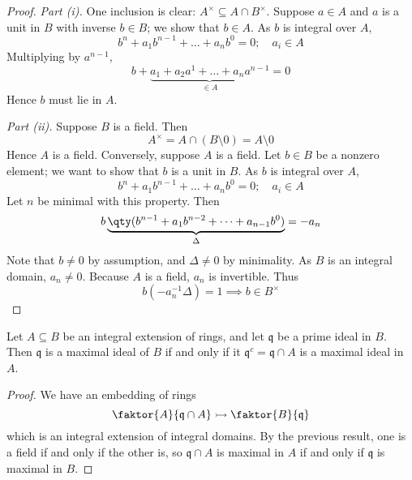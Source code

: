 \begin{proof}
    \emph{Part (i).}
    One inclusion is clear: \( A^\times \subseteq A \cap B^\times \).
    Suppose \( a \in A \) and \( a \) is a unit in \( B \) with inverse \( b \in B \); we show that \( b \in A \).
    As \( b \) is integral over \( A \),
    \[ b^n + a_1 b^{n-1} + \dots + a_n b^0 = 0;\quad a_i \in A \]
    Multiplying by \( a^{n-1} \),
    \[ b + \underbrace{a_1 + a_2 a^1 + \dots + a_n a^{n-1}}_{\in A} = 0 \]
    Hence \( b \) must lie in \( A \).

    \emph{Part (ii).}
    Suppose \( B \) is a field.
    Then
    \[ A^\times = A \cap (B \setminus \qty{0}) = A \setminus \qty{0} \]
    Hence \( A \) is a field.
    Conversely, suppose \( A \) is a field.
    Let \( b \in B \) be a nonzero element; we want to show that \( b \) is a unit in \( B \).
    As \( b \) is integral over \( A \),
    \[ b^n + a_1 b^{n-1} + \dots + a_n b^0 = 0;\quad a_i \in A \]
    Let \( n \) be minimal with this property.
    Then
    \[ b\underbrace{\qty(b^{n-1} + a_1 b^{n-2} + \dots + a_{n-1} b^0)}_{\Delta} = -a_n \]
    Note that \( b \neq 0 \) by assumption, and \( \Delta \neq 0 \) by minimality.
    As \( B \) is an integral domain, \( a_n \neq 0 \).
    Because \( A \) is a field, \( a_n \) is invertible.
    Thus
    \[ b(-a_n^{-1} \Delta) = 1 \implies b \in B^\times \]
\end{proof}
\begin{corollary}
    Let \( A \subseteq B \) be an integral extension of rings, and let \( \mathfrak q \) be a prime ideal in \( B \).
    Then \( \mathfrak q \) is a maximal ideal of \( B \) if and only if it \( \mathfrak q^c = \mathfrak q \cap A \) is a maximal ideal in \( A \).
\end{corollary}
\begin{proof}
    We have an embedding of rings
    \[ \faktor{A}{\mathfrak q \cap A} \rightarrowtail \faktor{B}{\mathfrak q} \]
    which is an integral extension of integral domains.
    By the previous result, one is a field if and only if the other is, so \( \mathfrak q \cap A \) is maximal in \( A \) if and only if \( \mathfrak q \) is maximal in \( B \).
\end{proof}

